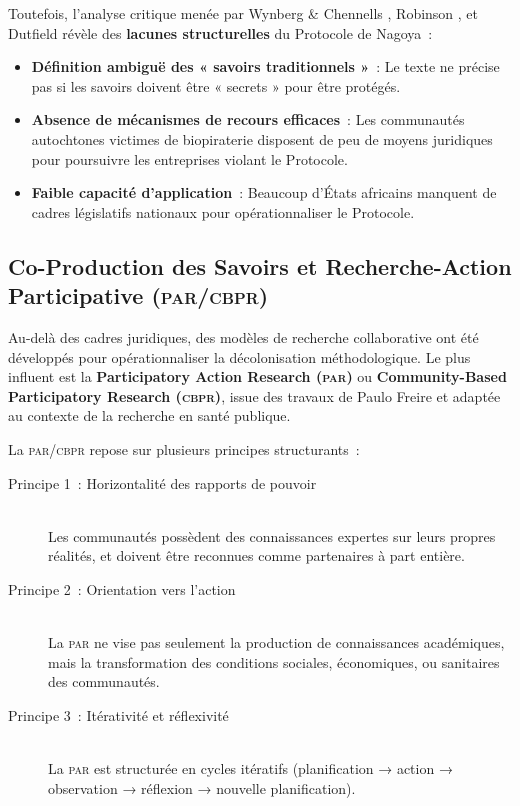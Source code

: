 \documentclass[12pt,a4paper,twoside]{book}
\begin{document}
Toutefois, l'analyse critique menée par Wynberg \& Chennells \parencite{wynberg2009}, Robinson \parencite{robinson2010}, et Dutfield \parencite{dutfield2009} révèle des \textbf{lacunes structurelles} du Protocole de Nagoya~:

\begin{itemize}
\item \textbf{Définition ambiguë des « savoirs traditionnels »}~: Le texte ne précise pas si les savoirs doivent être « secrets » pour être protégés.

\item \textbf{Absence de mécanismes de recours efficaces}~: Les communautés autochtones victimes de biopiraterie disposent de peu de moyens juridiques pour poursuivre les entreprises violant le Protocole.

\item \textbf{Faible capacité d'application}~: Beaucoup d'États africains manquent de cadres législatifs nationaux pour opérationnaliser le Protocole.
\end{itemize}

\subsection{Co-Production des Savoirs et Recherche-Action Participative (\textsc{par}/\textsc{cbpr})}

Au-delà des cadres juridiques, des modèles de recherche collaborative ont été développés pour opérationnaliser la décolonisation méthodologique. Le plus influent est la \textbf{Participatory Action Research (\textsc{par})} ou \textbf{Community-Based Participatory Research (\textsc{cbpr})}, issue des travaux de Paulo Freire et adaptée au contexte de la recherche en santé publique.

La \textsc{par}/\textsc{cbpr} repose sur plusieurs principes structurants~:

\begin{description}
\item[Principe 1~: Horizontalité des rapports de pouvoir] \hfill \\
Les communautés possèdent des connaissances expertes sur leurs propres réalités, et doivent être reconnues comme partenaires à part entière.

\item[Principe 2~: Orientation vers l'action] \hfill \\
La \textsc{par} ne vise pas seulement la production de connaissances académiques, mais la transformation des conditions sociales, économiques, ou sanitaires des communautés.

\item[Principe 3~: Itérativité et réflexivité] \hfill \\
La \textsc{par} est structurée en cycles itératifs (planification → action → observation → réflexion → nouvelle planification).
\end{description}
\end{document}
